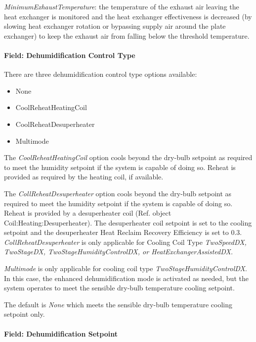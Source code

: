 \emph{MinimumExhaustTemperature}: the temperature of the exhaust air leaving the heat exchanger is monitored and the heat exchanger effectiveness is decreased (by slowing heat exchanger rotation or bypassing supply air around the plate exchanger) to keep the exhaust air from falling below the threshold temperature.

\paragraph{Field: Dehumidification Control Type}\label{field-dehumidification-control-type-7}

There are three dehumidification control type options available:

\begin{itemize}
\item
  None
\item
  CoolReheatHeatingCoil
\item
  CoolReheatDesuperheater
\item
  Multimode
\end{itemize}

The \emph{CoolReheatHeatingCoil} option cools beyond the dry-bulb setpoint as required to meet the humidity setpoint if the system is capable of doing so. Reheat is provided as required by the heating coil, if available.

The \emph{CollReheatDesuperheater} option cools beyond the dry-bulb setpoint as required to meet the humidity setpoint if the system is capable of doing so. Reheat is provided by a desuperheater coil (Ref. object Coil:Heating:Desuperheater). The desuperheater coil setpoint is set to the cooling setpoint and the desuperheater Heat Reclaim Recovery Efficiency is set to 0.3. \emph{CollReheatDesuperheater} is only applicable for Cooling Coil Type \emph{TwoSpeedDX, TwoStageDX, TwoStageHumidityControlDX, or HeatExchangerAssistedDX.}

\emph{Multimode} is only applicable for cooling coil type \emph{TwoStageHumidityControlDX}. In this case, the enhanced dehumidification mode is activated as needed, but the system operates to meet the sensible dry-bulb temperature cooling setpoint.

The default is \emph{None} which meets the sensible dry-bulb temperature cooling setpoint only.

\paragraph{Field: Dehumidification Setpoint}\label{field-dehumidification-setpoint-4}

